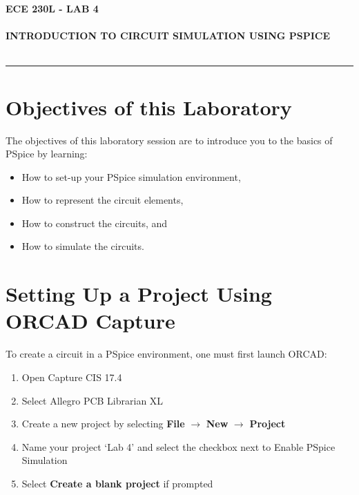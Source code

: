 \documentclass[12pt]{../manual}
\begin{document}
\begin{center}
\textbf{\huge ECE 230L - LAB 4}\\~\\
\textbf{\large INTRODUCTION TO CIRCUIT SIMULATION USING PSPICE}\\~\\
\rule{6.5in}{0.5mm}
\end{center}

\tableofcontents

\listoffigures

\newpage
%
\section{Objectives of this Laboratory}
The objectives of this laboratory session are to introduce you to the basics of PSpice by learning:
\begin{itemize}
\item How to set-up your PSpice simulation environment,
\item How to represent the circuit elements,
\item How to construct the circuits, and
\item How to simulate the circuits.
\end{itemize}
%
\section{Setting Up a Project Using ORCAD Capture}
To create a circuit in a PSpice environment, one must first launch ORCAD:
\begin{enumerate}
	\item Open Capture CIS 17.4
	\item Select Allegro PCB Librarian XL
	\item Create a new project by selecting {\bf File} $\to$ {\bf New} $\to$ {\bf Project}
	\item Name your project `Lab 4' and select the checkbox next to Enable PSpice Simulation
	\item Select {\bf Create a blank project} if prompted
\end{enumerate}
\end{document}
